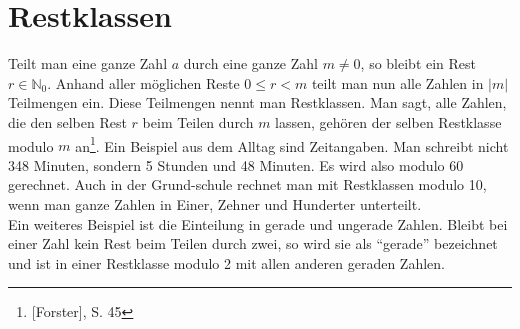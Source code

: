 \section{Restklassen}
Teilt man eine ganze Zahl $a$ durch eine ganze Zahl $m \neq 0$, so
bleibt ein Rest $r \in \mathbb{N}_0$. Anhand aller möglichen Reste
$0 \leq r < m$ teilt man nun alle Zahlen in $|m|$ Teilmengen ein.
Diese Teilmengen nennt man Restklassen. Man sagt, alle Zahlen, die
den selben Rest $r$ beim Teilen durch $m$ lassen, gehören der selben
Restklasse modulo $m$ an\footnote{[Forster], S. 45}.
Ein Beispiel aus dem Alltag sind Zeitangaben. Man schreibt nicht 348
Minuten, sondern 5 Stunden und 48 Minuten. Es wird also modulo 60
gerechnet. Auch in der Grund-schule rechnet man mit Restklassen
modulo 10, wenn man ganze Zahlen in Einer, Zehner und Hunderter
unterteilt.\\
Ein weiteres Beispiel ist die Einteilung in  gerade und ungerade
Zahlen. Bleibt bei einer Zahl kein Rest beim Teilen durch zwei, so
wird sie als "`gerade"' bezeichnet und ist in einer Restklasse
modulo 2 mit allen anderen geraden Zahlen.
